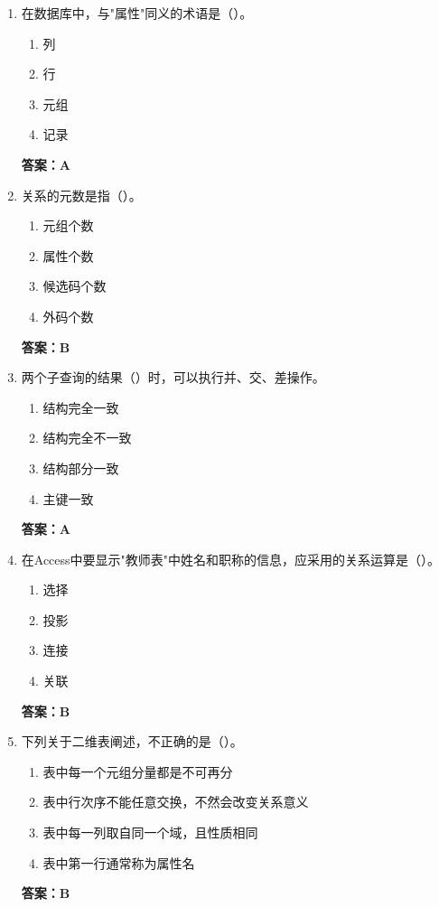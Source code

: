 \documentclass[12pt, a4paper]{article}
\begin{document}
\begin{enumerate}[label=\arabic*.]
	\item 在数据库中，与"属性"同义的术语是（\quad）。
	      \begin{enumerate}
		      \item 列
		      \item 行
		      \item 元组
		      \item 记录
	      \end{enumerate}
	      \textbf{答案：A}

	\item 关系的元数是指（\quad）。
	      \begin{enumerate}
		      \item 元组个数
		      \item 属性个数
		      \item 候选码个数
		      \item 外码个数
	      \end{enumerate}
	      \textbf{答案：B}

	\item 两个子查询的结果（\quad）时，可以执行并、交、差操作。
	      \begin{enumerate}
		      \item 结构完全一致
		      \item 结构完全不一致
		      \item 结构部分一致
		      \item 主键一致
	      \end{enumerate}
	      \textbf{答案：A}

	\item 在Access中要显示"教师表"中姓名和职称的信息，应采用的关系运算是（\quad）。
	      \begin{enumerate}
		      \item 选择
		      \item 投影
		      \item 连接
		      \item 关联
	      \end{enumerate}
	      \textbf{答案：B}

	\item 下列关于二维表阐述，不正确的是（\quad）。
	      \begin{enumerate}
		      \item 表中每一个元组分量都是不可再分
		      \item 表中行次序不能任意交换，不然会改变关系意义
		      \item 表中每一列取自同一个域，且性质相同
		      \item 表中第一行通常称为属性名
	      \end{enumerate}
	      \textbf{答案：B}


\end{enumerate}
\end{document}
